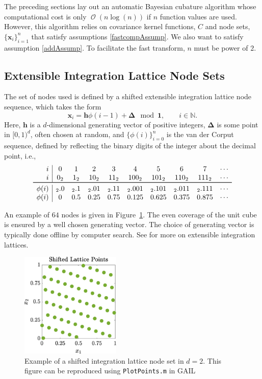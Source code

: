 \documentclass[twocolumn]{svjour3}          %
\DeclareMathOperator{\Order}{{\mathcal O}}
\newcommand{\bm}[1]{\boldsymbol{#1}}
\newcommand{\naturals}{\mathbb{N}}
\newcommand{\vDelta}{{\boldsymbol{\Delta}}}
\newcommand{\vh}{\bm{h}}
\newcommand{\vx}{\bm{x}}
\newcommand{\vone}{\bm{1}}
\newcommand{\code}[1]{\texttt{#1}}
\newcommand\figref{Figure~\ref}
\begin{document}
The preceding sections lay out an automatic Bayesian cubature algorithm whose computational cost is only $\Order(n \log(n))$ if $n$ function values are used.  However, this algorithm relies on covariance kernel functions, $C$ and node sets, $\{\vx_i\}_{i=1}^n$ that satisfy assumptions \eqref{fastcompAssump}.  We  also want to satisfy assumption \eqref{addAssump}.  
To facilitate the fast transform, $n$ must be power of $2$.  

\subsection{Extensible Integration Lattice Node Sets}

The set of nodes used is defined by a shifted extensible integration lattice node sequence, which takes the form
\begin{equation*}
\vx_{i} = \vh \phi(i-1) + \vDelta \mod \vone, \qquad i \in \naturals.
\end{equation*} 
Here, $\vh$ is a $d$-dimensional generating vector of positive integers, $\vDelta$ is some point in $[0,1)^d$, often chosen at random, and $\{\phi(i)\}_{i=0}^n$ is the van der Corput sequence, defined by reflecting the binary digits of the integer about the decimal point, i.e., 
\begin{align} \label{vdCDef}
\begin{array}{r|ccccccccccccc}
i & 0 & 1 & 2 & 3 & 4 &  5 & 6 & 7 & \cdots \\
i & 0_2 & 1_2 & 10_2 & 11_2 & 100_2 & 101_2 & 110_2 & 111_2  & \cdots\\
\toprule
\phi(i) & {}_2.0 &  {}_2.1 & {}_2.01 &  {}_2.11  & {}_2.001 &  {}_2.101 & {}_2.011 &  {}_2.111 & \cdots\\
\phi(i) & 0 &  0.5 &  0.25 & 0.75 &  0.125 & 0.625  &  0.375 & 0.875 & \cdots
\end{array}
\end{align}

An example of $64$ nodes is given in \figref{latticefig}.  The even coverage of the unit cube is ensured by a well chosen generating vector.  The choice of generating vector is typically done offline by computer search.  See \cite{DicEtal14a,HicNie03a} for more on extensible integration lattices.
\begin{figure}[htp]
	\centering
	\includegraphics[height=5cm]{ShiftedLatticePoints}
	\caption{Example of a shifted integration lattice node set  in $d=2$. 
	This figure can be reproduced using \code{PlotPoints.m} in GAIL} \label{latticefig}
\end{figure}
\end{document}
